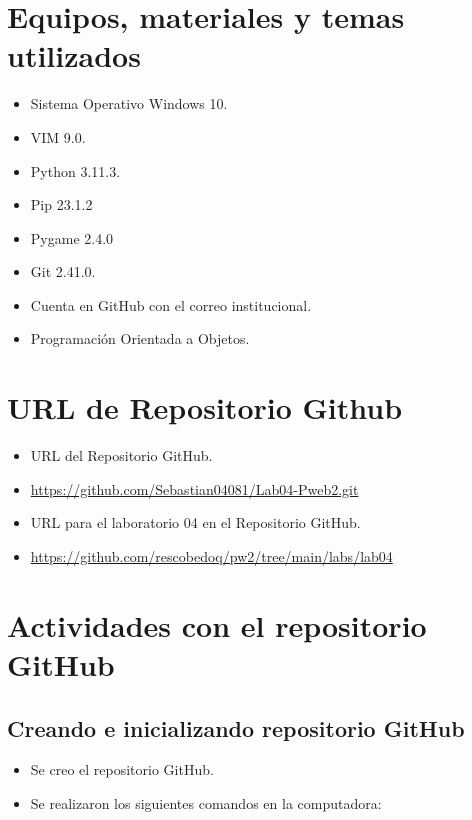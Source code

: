 \documentclass{article}
\begin{document}
\begin{itemize}
\begin{itemize}[leftmargin=2em]
			
		\end{itemize}
	\end{itemize}
	
	\section{Equipos, materiales y temas utilizados}
	\begin{itemize}
		\item Sistema Operativo Windows 10.
		\item VIM 9.0.
		\item Python 3.11.3.
		\item Pip 23.1.2
		\item Pygame 2.4.0
		\item Git 2.41.0.
		\item Cuenta en GitHub con el correo institucional.
		\item Programación Orientada a Objetos.	
	\end{itemize}
	
	\section{URL de Repositorio Github}
	\begin{itemize}
		\item URL del Repositorio GitHub.
		\item \url{https://github.com/Sebastian04081/Lab04-Pweb2.git}
		\item URL para el laboratorio 04 en el Repositorio GitHub.
		\item \url{https://github.com/rescobedoq/pw2/tree/main/labs/lab04}
	\end{itemize}
	
	
	
	\section{Actividades con el repositorio GitHub}
	
	\subsection{Creando e inicializando repositorio GitHub}
	\begin{itemize}	
		\item Se creo el repositorio GitHub.
		\item Se realizaron los siguientes comandos en la computadora:
	\end{itemize}	
	
\end{document}
